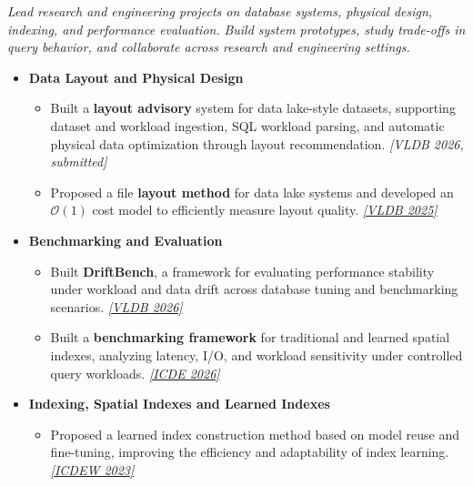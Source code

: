 \documentclass{resume}
\begin{document}
\textit{Lead research and engineering projects on database systems, physical design, indexing, and performance evaluation.}
\textit{Build system prototypes, study trade-offs in query behavior, and collaborate across research and engineering settings.}

\begin{itemize}[parsep=0.4ex]


\item \textbf{Data Layout and Physical Design}
\begin{itemize}[parsep=0.3ex]
    \item Built a \textbf{layout advisory} system for data lake-style datasets, supporting dataset and workload ingestion, SQL workload parsing, and automatic physical data optimization through layout recommendation.
    \href{https://github.com/Liuguanli/layout_advisor}{\faGithub}
    \textit{[VLDB 2026, submitted]}

    \item Proposed a file \textbf{layout method} for data lake systems and developed an \(\mathcal{O}(1)\) cost model to efficiently measure layout quality.
    \href{https://github.com/Liuguanli/LBMC}{\faGithub}
    \href{https://www.vldb.org/pvldb/vol17/p4773-liu.pdf}{\textit{[VLDB 2025\faExternalLink]}}
\end{itemize}

\item \textbf{Benchmarking and Evaluation}
\begin{itemize}[parsep=0.3ex]
    \item Built \textbf{DriftBench}, a framework for evaluating performance stability under workload and data drift across database tuning and benchmarking scenarios.
    \href{https://github.com/Liuguanli/DriftBench}{\faGithub}
    \href{https://arxiv.org/abs/2510.10858}{\textit{[VLDB 2026\faExternalLink]}}
    \item Built a \textbf{benchmarking framework} for traditional and learned spatial indexes, analyzing latency, I/O, and workload sensitivity under controlled query workloads. \href{https://github.com/Liuguanli/rl_spatial_benchmark}{\faGithub}
\href{https://arxiv.org/abs/2512.11161}{\textit{[ICDE 2026\faExternalLink]}}
\end{itemize}

\item \textbf{Indexing, Spatial Indexes and Learned Indexes}
\begin{itemize}[parsep=0.3ex]
    \item Proposed a learned index construction method based on model reuse and fine-tuning, improving the efficiency and adaptability of index learning.
\href{https://people.eng.unimelb.edu.au/jianzhongq/papers/DBML2023_ModelReuse.pdf}{\textit{[ICDEW 2023\faExternalLink]}}


\end{itemize}
\end{itemize}
\end{document}
